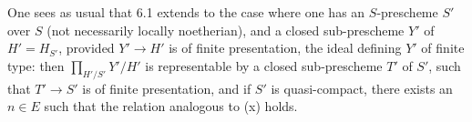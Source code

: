One sees as usual that 6.1 extends to the case where one has an $S$-prescheme $S'$ over $S$ (not necessarily locally noetherian), and a closed sub-prescheme $Y'$ of $H'=H_{S'}$, provided $Y'\to H'$ is of finite presentation, \ie the ideal defining $Y'$ of finite type: then $\prod_{H'/S'}Y'/H'$ is representable by a closed sub-prescheme $T'$ of $S'$, such that $T'\to S'$ is of finite presentation, and if $S'$ is quasi-compact, there exists an $n\in E$ such that the relation analogous to (x) holds.
